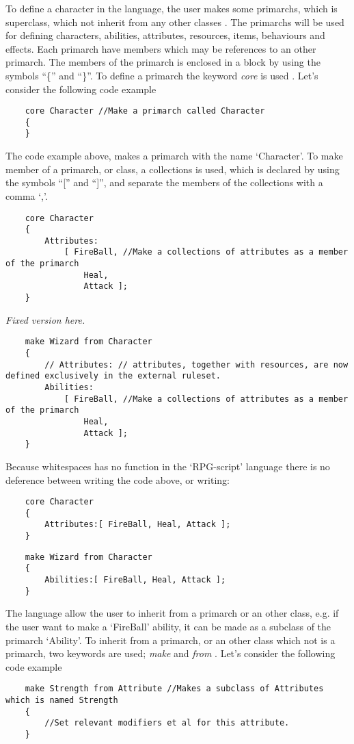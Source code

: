 To define a character in the language, the user makes some primarchs, which is superclass, which not inherit from any other classes . The primarchs will be used for defining characters, abilities, attributes, resources, items, behaviours and effects.
Each primarch have members which may be references to an other primarch. The members of the primarch is enclosed in a block by using the symbols ``\{'' and ``\}''. To define a primarch the keyword \emph{core} is used .
Let's consider the following code example 
\begin{lstlisting}
	core Character //Make a primarch called Character
	{
	}
\end{lstlisting}
The code example above, makes a primarch with the name `Character'. 
To make member of a primarch, or class, a collections is used, which is declared by using the symbols ``['' and ``]'', and separate the members of the collections with a comma `,'.
\begin{lstlisting}
	core Character
	{
		Attributes:
			[ FireBall, //Make a collections of attributes as a member of the primarch
				Heal,
				Attack ]; 
	}
\end{lstlisting}
\emph{Fixed version here.}
\begin{lstlisting}
	make Wizard from Character
	{	
		// Attributes: // attributes, together with resources, are now defined exclusively in the external ruleset.
		Abilities:
			[ FireBall, //Make a collections of attributes as a member of the primarch
				Heal,
				Attack ]; 
	}
\end{lstlisting}
Because whitespaces has no function in the `RPG-script' language there is no deference between writing the code above, or writing:
\begin{lstlisting}
	core Character
	{
		Attributes:[ FireBall, Heal, Attack ];
	}
\end{lstlisting}
\begin{lstlisting}
	make Wizard from Character
	{
		Abilities:[ FireBall, Heal, Attack ];
	}
\end{lstlisting}
The language allow the user to inherit from a primarch or an other class, e.g. if the user want to make a `FireBall' ability, it can be made as a subclass of the primarch `Ability'. To inherit from a primarch, or an other class which not is a primarch, two keywords are used; \emph{make} and \emph{from} .
Let's consider the following code example
\begin{lstlisting}
	make Strength from Attribute //Makes a subclass of Attributes which is named Strength
	{
		//Set relevant modifiers et al for this attribute.
	}
\end{lstlisting}

